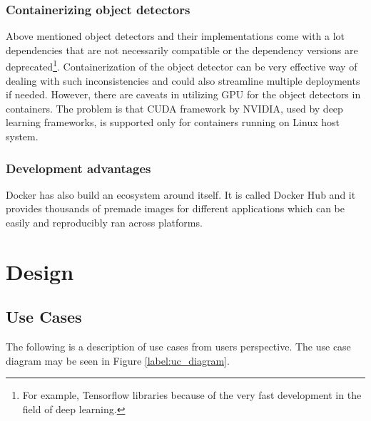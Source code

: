 \documentclass[thesis=M,english]{FITthesis}[2019/03/06]
\begin{document}
\subsection{Containerizing object detectors}
Above mentioned object detectors and their implementations come with a lot dependencies that are not necessarily compatible or the dependency versions are deprecated\footnote{For example, Tensorflow libraries because of the very fast development in the field of deep learning.}. Containerization of the object detector can be very effective way of dealing with such inconsistencies and could also streamline multiple deployments if needed. However, there are caveats in utilizing GPU for the object detectors in containers. The problem is that CUDA framework by NVIDIA, used by deep learning frameworks,  is supported only for containers running on Linux host system. \\

\subsection{Development advantages}
Docker has also build an ecosystem around itself.  It is called Docker Hub and it provides thousands of premade images for different applications which can be easily and reproducibly ran across platforms. \\



\chapter{Design}

\section{Use Cases}
The following is a description of use cases from users perspective. The use case diagram may be seen in Figure \ref{label:uc_diagram}.
\end{document}
